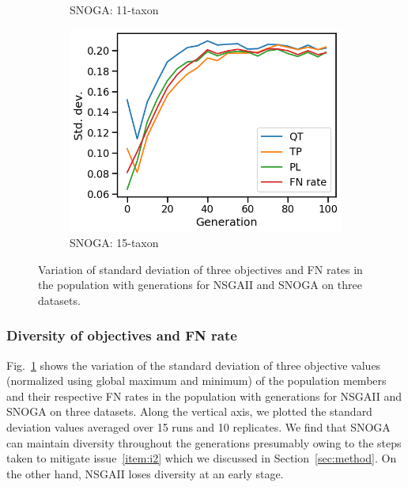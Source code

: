 \begin{figure}[!htbp]
\begin{subfigure}[b]{0.33\textwidth}
			\caption{SNOGA: 11-taxon}
\end{subfigure}\begin{subfigure}[b]{0.33\textwidth}
			\includegraphics[width=\textwidth]{Figure/15-taxon_NOSSGA_std_dev}
			\caption{SNOGA: 15-taxon}
\end{subfigure}
		\caption{Variation of standard deviation of three objectives and FN rates in the population with generations for NSGAII and SNOGA on three datasets.}
		\label{fig:gen_wise_std_dev}
\end{figure}

\subsubsection{Diversity of objectives and FN rate}\label{subsubsec:diversity} Fig.~\ref{fig:gen_wise_std_dev} shows the variation of the standard deviation of three objective values (normalized using global maximum and minimum) of the population members and their respective FN rates in the population with generations for NSGAII and SNOGA on three datasets. Along the vertical axis, we plotted the standard deviation values averaged over 15 runs and 10 replicates. We find that SNOGA can maintain diversity throughout the generations presumably owing to the steps taken to mitigate issue~\ref{item:i2} which we discussed in Section~\ref{sec:method}. On the other hand, NSGAII loses diversity at an early stage.


